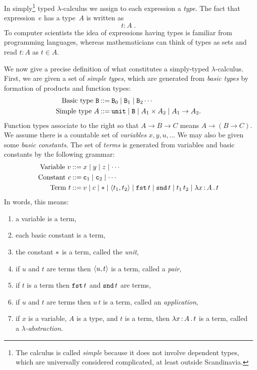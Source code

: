 In simply\footnote{The calculus is called \emph{simple} because it
  does not involve dependent types, which are universally considered
  complicated, at least outside Scandinavia.} typed $\lambda$-calculus
we assign to each expression a \emph{type}. The fact that
expression~$e$ has a type~$A$ is written as
%
\begin{equation*}
  t : A \;.
\end{equation*}
%
To computer scientists the idea of expressions having types is
familiar from programming languages, whereas mathematicians can think
of types as sets and read $t : A$ as $t \in A$.

We now give a precise definition of what constitutes a simply-typed
$\lambda$-calculus. First, we are given a set of \emph{simple types},
which are generated from \emph{basic types} by formation of products
and function types:
%
\begin{align*}
  \text{Basic type}\ \mathtt{B} &\mathbin{{:}{:}{=}}
  \mathtt{B}_0 \mid \mathtt{B}_1 \mid \mathtt{B}_2 \cdots \\
  \text{Simple type}\ A &\mathbin{{:}{:}{=}} \mathtt{unit} \mid \mathtt{B} \mid A_1 \times A_2 \mid
  A_1 \to A_2.
\end{align*}
%
Function types associate to the right so that $A \to B \to C$ means $A
\to (B \to C)$. We assume there is a countable set of \emph{variables}
$x, y, u, \ldots$ We may also be given some \emph{basic constants}.
The set of \emph{terms} is generated from variables and basic
constants by the following grammar:
%
\begin{align*}
  \text{Variable}\ v &\mathbin{{:}{:}{=}} x \mid y \mid z \mid \cdots \\
  \text{Constant}\ c &\mathbin{{:}{:}{=}} \mathtt{c}_1 \mid \mathtt{c}_2 \mid \cdots \\
  \text{Term}\ t &\mathbin{{:}{:}{=}}
  v \mid
  c \mid
  {*} \mid
  \langle t_1, t_2 \rangle \mid
  \mathtt{fst}\,t \mid
  \mathtt{snd}\,t \mid
  t_1 \, t_2 \mid
  \lambda x \,{:}\, A\,.\,t
\end{align*}
%
In words, this means:
%
\begin{enumerate}
\item a variable is a term,
\item each basic constant is a term,
\item the constant ${*}$ is a term, called the \emph{unit},
\item if $u$ and $t$ are terms then $\langle u, t \rangle$ is a term, called a
  \emph{pair},
\item if $t$ is a term then $\mathtt{fst}\,t$ and $\mathtt{snd}\,t$ are terms,
\item if $u$ and $t$ are terms then $u\, t$ is a term, called an
  \emph{application},
\item if $x$ is a variable, $A$ is a type, and $t$ is a term, then
  $\lambda x \,{:}\, A\,.\,t$ is a term, called a \emph{$\lambda$-abstraction}.
\end{enumerate}
